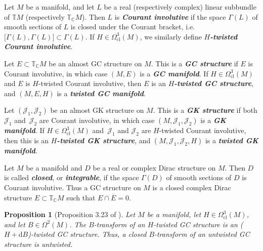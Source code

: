 \documentclass[pdftex]{sigma}
\newtheorem{Proposition}[Theorem]{Proposition}
\numberwithin{equation}{section}
\newcommand{\deff}[1]{\textbf{\emph{#1}}}
\newcommand{\pont}[1]{\mathbb{T} {#1}}
\newcommand{\cpont}[1]{\mathbb{T}_{\mathbb{C}} {#1}}
\begin{document}
\begin{Definition}
Let $M$ be a manifold, and let $L$ be a real (respectively complex) linear subbundle of $\pont{M}$ (respectively $\cpont{M}$).  Then $L$ is \deff{Courant involutive} if the space $\Gamma(L)$ of smooth sections of $L$ is closed under the Courant bracket, i.e. $\big[ \Gamma(L), \Gamma(L) \big] \subset \Gamma(L)$.  If $H \in \Omega_{\text{cl}}^3(M)$, we similarly def\/ine \deff{$H$-twisted Courant involutive}.

Let $E \subset \cpont{M}$ be an almost GC structure on $M$.  This is a \deff{GC structure} if $E$ is Courant involutive, in which case $(M,E)$ is a \deff{GC manifold}.  If $H \in \Omega_{\text{cl}}^3(M)$ and $E$ is $H$-twisted Courant involutive, then $E$ is an \deff{$H$-twisted GC structure}, and $(M,E,H)$ is a \deff{twisted GC manifold}.

Let $(\mathcal{J}_1, \mathcal{J}_2)$ be an almost GK structure on $M$.  This is a \deff{GK structure} if both $\mathcal{J}_1$ and~$\mathcal{J}_2$ are Courant involutive, in which case $(M,\mathcal{J}_1,\mathcal{J}_2)$ is a \deff{GK manifold}.  If $H \in \Omega_{\text{cl}}^3(M)$ and~$\mathcal{J}_1$ and $\mathcal{J}_2$ are $H$-twisted Courant involutive, then this is an \deff{$H$-twisted GK structure}, and $(M,\mathcal{J}_1,\mathcal{J}_2,H)$ is a \deff{twisted GK manifold}.
\end{Definition}


\begin{Remark}
Let $M$ be a manifold and $D$ be a real or complex Dirac structure on $M$.  Then $D$ is called \deff{closed}, or \deff{integrable}, if the space $\Gamma(D)$ of smooth sections of $D$ is Courant involutive.  Thus a GC structure on $M$ is a closed complex Dirac structure $E \subset \cpont{M}$ such that $E \cap \overline{E} = 0$.
\end{Remark}


\begin{Proposition}[Proposition 3.23 of \cite{gualtieri}]
Let $M$ be a manifold, let $H \in \Omega_{\text{cl}}^3(M)$, and let $B \in \Omega^2(M)$.  The $B$-transform of an $H$-twisted GC structure is an ($H + \mathrm{d} B$)-twisted GC structure.  Thus, a closed $B$-transform of an untwisted GC structure is untwisted.
\end{Proposition}
\end{document}
